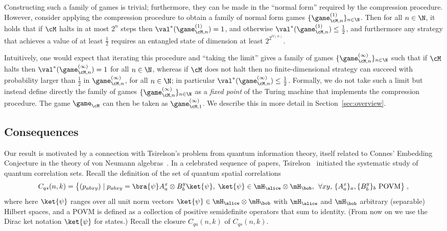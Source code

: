 Constructing such a family of games is trivial; furthermore, they can be made in the  ``normal form'' required by the compression procedure. However, consider applying the compression procedure to obtain a family of normal form games $\{ \game_{\cM,n}^{(1)} \}_{n\in\N}$. Then for all $n \in \N$, it holds that if $\cM$ halts in at most $2^n$ steps then $\val^*(\game_{\cM,n}^{(1)})=1$, and otherwise $\val^*(\game_{\cM,n}^{(1)})\leq \frac{1}{2}$, and furthermore any strategy that achieves a value of at least $\frac{1}{2}$ requires an entangled state of dimension at least $2^{2^{\Omega(n)}}$.



Intuitively, one would expect that iterating this procedure and ``taking the limit'' gives a family of games $\{ \game_{\cM,n}^{(\infty)} \}_{n\in\N}$ such that if $\cM$ halts then $\val^*(\game_{\cM,n}^{(\infty)})=1$ for all $n \in \N$, whereas if $\cM$ does not halt then no finite-dimensional strategy can succeed with probability larger than $\frac{1}{2}$ in $\game_{\cM,n}^{(\infty)}$, for all $n \in \N$; in particular $\val^*(\game_{\cM,n}^{(\infty)})\leq \frac{1}{2}$. 
Formally, we do not take such a limit but instead define directly the family of games $\{ \game_{\cM,n}^{(\infty)} \}_{n\in\N}$ as a \emph{fixed point} of the Turing machine that implements the compression procedure. The game $\game_\cM$ can then be taken as $\game_{\cM,1}^{(\infty)}$. We describe this in more detail in Section~\ref{sec:overview}. 


	
	
	
	





	

\subsection{Consequences}
\label{sec:consequences}

	Our result is motivated by a connection with Tsirelson's problem from quantum information theory, itself related to Connes' Embedding Conjecture in the theory of von Neumann algebras~\cite{connes1976classification}. 
In a celebrated sequence of papers, Tsirelson~\cite{tsirelson1993some} initiated the systematic study of quantum correlation sets. Recall the definition of the set of quantum spatial correlations 
\begin{equation}
\label{eq:spatial}
	C_{qs}(n,k) = \big\{ (p_{abxy} ) \mid p_{abxy} = \bra{\psi} A^x_a \otimes B^y_b \ket{\psi}, \; \ket{\psi} \in  \mH_\alice \otimes \mH_\bob,\,\;\forall xy,\, \{A^x_a\}_a,\{B^y_b\}_b\text{ POVM}\big\}\;,
\end{equation}
where here $\ket{\psi}$ ranges over all unit norm vectors $\ket{\psi} \in \mH_\alice \otimes \mH_\bob$ with $\mH_\alice$ and $\mH_\bob$ arbitrary (separable) Hilbert spaces, and a POVM is defined as a collection of positive semidefinite operators that sum to identity. (From now on we use the Dirac ket notation $\ket{\psi}$ for states.) Recall the closure $C_{qa}(n,k)$ of $C_{qs}(n,k)$.

